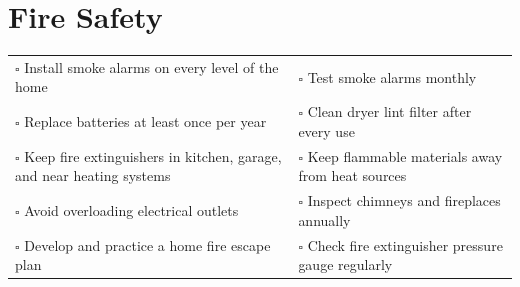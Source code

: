 
\section{Fire Safety}
\label{sec:fire}

\begin{tabular}{p{9cm} p{8cm}}
$\square$ Install smoke alarms on every level of the home & $\square$ Test smoke alarms monthly \\ 
$\square$ Replace batteries at least once per year & $\square$ Clean dryer lint filter after every use \\ 
$\square$ Keep fire extinguishers in kitchen, garage, and near heating systems & $\square$ Keep flammable materials away from heat sources \\ 
$\square$ Avoid overloading electrical outlets & $\square$ Inspect chimneys and fireplaces annually \\ 
$\square$ Develop and practice a home fire escape plan & $\square$ Check fire extinguisher pressure gauge regularly \\ 
\end{tabular}

